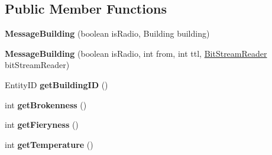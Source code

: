 \subsection*{Public Member Functions}
\begin{DoxyCompactItemize}
\item 
\hypertarget{classadf_1_1agent_1_1communication_1_1standard_1_1bundle_1_1information_1_1MessageBuilding_adb36447846be8e6fbd72c54a3a97aff6}{}\label{classadf_1_1agent_1_1communication_1_1standard_1_1bundle_1_1information_1_1MessageBuilding_adb36447846be8e6fbd72c54a3a97aff6} 
{\bfseries Message\+Building} (boolean is\+Radio, Building building)
\item 
\hypertarget{classadf_1_1agent_1_1communication_1_1standard_1_1bundle_1_1information_1_1MessageBuilding_ae77a05a1e0a443311a38594a5071f396}{}\label{classadf_1_1agent_1_1communication_1_1standard_1_1bundle_1_1information_1_1MessageBuilding_ae77a05a1e0a443311a38594a5071f396} 
{\bfseries Message\+Building} (boolean is\+Radio, int from, int ttl, \hyperlink{classadf_1_1component_1_1communication_1_1util_1_1BitStreamReader}{Bit\+Stream\+Reader} bit\+Stream\+Reader)
\item 
\hypertarget{classadf_1_1agent_1_1communication_1_1standard_1_1bundle_1_1information_1_1MessageBuilding_ae1a24cb6c0fd82b65789574375afff4a}{}\label{classadf_1_1agent_1_1communication_1_1standard_1_1bundle_1_1information_1_1MessageBuilding_ae1a24cb6c0fd82b65789574375afff4a} 
Entity\+ID {\bfseries get\+Building\+ID} ()
\item 
\hypertarget{classadf_1_1agent_1_1communication_1_1standard_1_1bundle_1_1information_1_1MessageBuilding_a3fc5b91f416e39e96613b2f76d37f2ea}{}\label{classadf_1_1agent_1_1communication_1_1standard_1_1bundle_1_1information_1_1MessageBuilding_a3fc5b91f416e39e96613b2f76d37f2ea} 
int {\bfseries get\+Brokenness} ()
\item 
\hypertarget{classadf_1_1agent_1_1communication_1_1standard_1_1bundle_1_1information_1_1MessageBuilding_a806d08b34a2a2bf6192f6b6ae79370a0}{}\label{classadf_1_1agent_1_1communication_1_1standard_1_1bundle_1_1information_1_1MessageBuilding_a806d08b34a2a2bf6192f6b6ae79370a0} 
int {\bfseries get\+Fieryness} ()
\item 
\hypertarget{classadf_1_1agent_1_1communication_1_1standard_1_1bundle_1_1information_1_1MessageBuilding_af519f1347f235a1eabe448b7e62dd133}{}\label{classadf_1_1agent_1_1communication_1_1standard_1_1bundle_1_1information_1_1MessageBuilding_af519f1347f235a1eabe448b7e62dd133} 
int {\bfseries get\+Temperature} ()
\item 

\end{DoxyCompactItemize}
